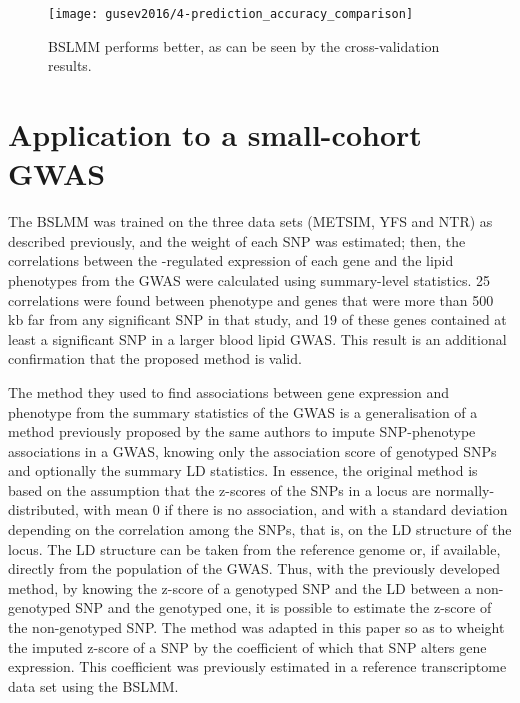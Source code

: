 \documentclass[../main.tex]{subfiles}
\begin{document}
\begin{figure}
	\centering
	\texttt{[image: gusev2016/4-prediction\_accuracy\_comparison]}
	\caption{BSLMM performs better, as can be seen by the 
		cross-validation results.}
\end{figure}

\section{Application to a small-cohort GWAS}

The BSLMM was trained on the three data sets (METSIM, YFS and NTR) as 
described previously, and the weight of each SNP was estimated; then, 
the correlations between the \cis-regulated expression of each gene and 
the lipid phenotypes from the GWAS were calculated using summary-level 
statistics. 25 correlations were found between phenotype and genes that 
were more than 500 kb far from any significant SNP in that study, and 19 
of these genes contained at least a significant SNP in a larger blood 
lipid GWAS. This result is an additional confirmation that the proposed 
method is valid.

The method they used to find associations between gene expression and 
phenotype from the summary statistics of the GWAS is a generalisation of 
a method previously proposed by the same authors to impute SNP-phenotype 
associations in a GWAS, knowing only the association score of genotyped 
SNPs\autocite{Pasaniuc2014} and optionally the summary LD statistics. In 
essence, the original method is based on the assumption that the 
z-scores of the SNPs in a locus are normally-distributed, with mean $0$ if 
there is no association, and with a standard deviation depending on the 
correlation among the SNPs, that is, on the LD structure of the locus. 
The LD structure can be taken from the reference genome or, if 
available, directly from the population of the GWAS. Thus, with the 
previously developed method, by knowing the z-score of a genotyped SNP 
and the LD between a non-genotyped SNP and the genotyped one, it is 
possible to estimate the z-score of the non-genotyped SNP. The method 
was adapted in this paper so as to wheight the imputed z-score of a SNP 
by the coefficient of which that SNP alters gene expression. This 
coefficient was previously estimated in a reference transcriptome data 
set using the BSLMM.
\end{document}
